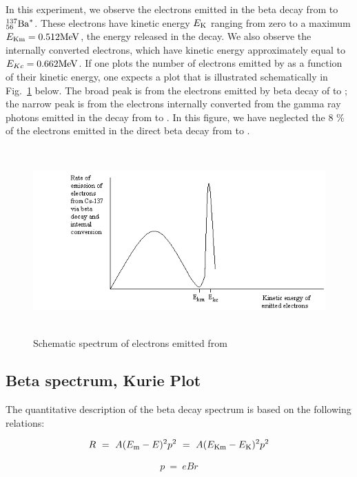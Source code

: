 In this experiment, we observe the electrons emitted in the beta
decay from \cs to ${}^{137}_{56}{\rm Ba}^*$.  These electrons have kinetic energy
$E_{\rm K}$ ranging from zero to a maximum 
$E_{\rm Km} = 0.512 {\rm MeV}$, the energy released
in the decay.  We also observe the internally converted electrons,
which have kinetic energy approximately equal to
$E_{Kc} = 0.662 {\rm MeV}$.  If one plots the
number of electrons emitted by \cs as a function of their kinetic
energy, one expects a plot that is illustrated schematically in Fig.~\ref{fig:Espectrum}
below.  The broad peak is from the electrons emitted by beta decay of
\cs to \bam;  the narrow peak is from the electrons internally
converted from the gamma ray photons emitted in the decay from \bam
to \ba.  In this figure, we have neglected the 8 \% of the electrons emitted 
in the direct beta decay from \cs to \ba.
\begin{figure}
\begin{centering}
\includegraphics[width=5.889in,height=2.8189in]{../images/beta-img2.png} 
\caption{Schematic spectrum of electrons emitted from \cs}
\label{fig:Espectrum}
\end{centering}
\end{figure}

\subsection{Beta spectrum, Kurie Plot}

The quantitative description of the beta decay spectrum is based on the
following relations:

\begin{equation}
R~=~A(E_{\rm m} - E)^2p^2~=~A(E_{\rm Km} - E_{\rm K})^2p^2
\label{eq:1}
\end{equation}

\begin{equation}
p~=~e B r
\label{eq:2}
\end{equation}

